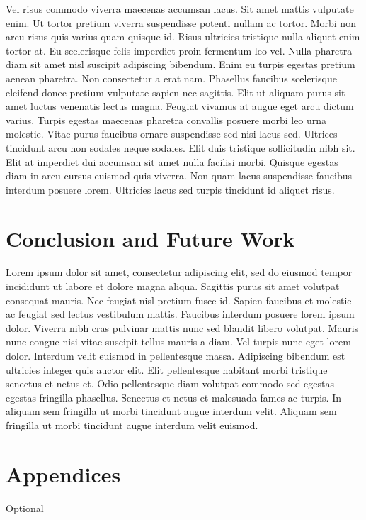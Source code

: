 \documentclass[conference]{IEEEtran}
\begin{document}
Vel risus commodo viverra maecenas accumsan lacus. Sit amet mattis vulputate enim. Ut tortor pretium viverra suspendisse potenti nullam ac tortor. Morbi non arcu risus quis varius quam quisque id. Risus ultricies tristique nulla aliquet enim tortor at. Eu scelerisque felis imperdiet proin fermentum leo vel. Nulla pharetra diam sit amet nisl suscipit adipiscing bibendum. Enim eu turpis egestas pretium aenean pharetra. Non consectetur a erat nam. Phasellus faucibus scelerisque eleifend donec pretium vulputate sapien nec sagittis. Elit ut aliquam purus sit amet luctus venenatis lectus magna. Feugiat vivamus at augue eget arcu dictum varius. Turpis egestas maecenas pharetra convallis posuere morbi leo urna molestie. Vitae purus faucibus ornare suspendisse sed nisi lacus sed. Ultrices tincidunt arcu non sodales neque sodales. Elit duis tristique sollicitudin nibh sit. Elit at imperdiet dui accumsan sit amet nulla facilisi morbi. Quisque egestas diam in arcu cursus euismod quis viverra. Non quam lacus suspendisse faucibus interdum posuere lorem. Ultricies lacus sed turpis tincidunt id aliquet risus.

\section{Conclusion and Future Work}
Lorem ipsum dolor sit amet, consectetur adipiscing elit, sed do eiusmod tempor incididunt ut labore et dolore magna aliqua. Sagittis purus sit amet volutpat consequat mauris. Nec feugiat nisl pretium fusce id. Sapien faucibus et molestie ac feugiat sed lectus vestibulum mattis. Faucibus interdum posuere lorem ipsum dolor. Viverra nibh cras pulvinar mattis nunc sed blandit libero volutpat. Mauris nunc congue nisi vitae suscipit tellus mauris a diam. Vel turpis nunc eget lorem dolor. Interdum velit euismod in pellentesque massa. Adipiscing bibendum est ultricies integer quis auctor elit. Elit pellentesque habitant morbi tristique senectus et netus et. Odio pellentesque diam volutpat commodo sed egestas egestas fringilla phasellus. Senectus et netus et malesuada fames ac turpis. In aliquam sem fringilla ut morbi tincidunt augue interdum velit. Aliquam sem fringilla ut morbi tincidunt augue interdum velit euismod.

\section{Appendices}
Optional
\end{document}

